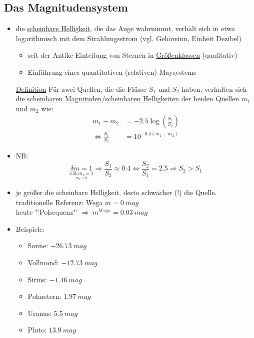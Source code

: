 \subsection{Das Magnitudensystem}
\begin{itemize}[label={$\to$}]
	\item die \underline{scheinbare Helligkeit}, die das Auge wahrnimmt, verhält sich in etwa logarithmisch mit dem Strahlungsstrom (vgl. Gehörsinn, Einheit Dezibel)
		\begin{itemize}[label={$\Rightarrow$}]
			\item seit der Antike Einteilung von Sternen in \underline{Größenklassen} (qualitativ)
			\item Einführung eines quantitativen (relativen) Maysystems
		\end{itemize}
	\item[\underline{Definition}] Für zwei Quellen, die die Flüsse $S_1$ und $S_2$ haben, verhalten sich die \underline{scheinbaren Magnituden}/\underline{scheinbaren Helligkeiten} der beiden Quellen $m_1$ und $m_2$ wie:
		\begin{align*}
			m_1-m_2&=-\num{2.5}\log\left(\frac{S_1}{S_2}\right)\\
			\Leftrightarrow \frac{S_1}{S_2}&=10^{-\num{0.4}(m_1-m_2)}
		\end{align*}
	\item NB:
		\begin{equation*}
			\underset{\underset{m_2=0}{\text{z.B.} m_1=1}}{\delta m=1} \Rightarrow \frac{S_1}{S_2}\approx \num{0.4} \Leftrightarrow \frac{S_2}{S_1}=\num{2.5}\Rightarrow S_2>S_1
		\end{equation*}
	\item je größer die scheinbare Helligkeit, desto schwächer (!) die Quelle.\\
		traditionelle Referenz: Wega $m=0 \ mag$\\
		heute "'Polsequenz"' $\Rightarrow \ m^{\text{Wega}}=\num{0.03} \ mag$
		\clearpage
	\item Beispiele:
		\begin{itemize}[label={}]
			\item Sonne: $-\num{26.73}\ \si{mag}$
			\item Vollmond: $-\num{12.73}\ \si{mag}$
			\item Sirius: $-\num{1.46}\ \si{mag}$
			\item Polarstern: $\num{1.97}\ \si{mag}$
			\item Uranus: $\num{5.5}\ \si{mag}$
			\item Pluto: $\num{13.9}\ \si{mag}$
		\end{itemize}
\end{itemize}
